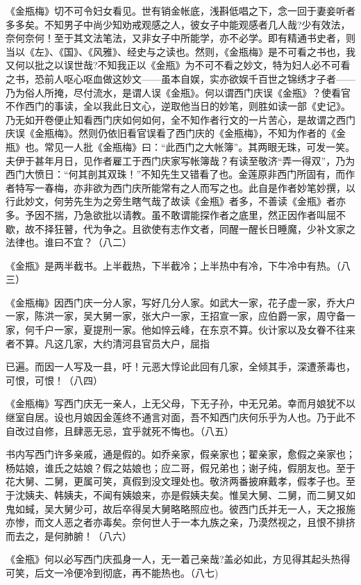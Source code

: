 {《金瓶梅》切不可令妇女看见。世有销金帐底，浅斟低唱之下，念一回于妻妾听者多多矣。不知男子中尚少知劝戒观感之人，彼女子中能观感者几人哉?少有效法，奈何奈何！至于其文法笔法，又非女子中所能学，亦不必学。即有精通书史者，则当以《左》、《国》、《风雅》、经史与之读也。然则，《金瓶梅》是不可看之书也，我又何以批之以误世哉?不知我正以《金瓶》为不可不看之妙文，特为妇人必不可看之书，恐前人呕心呕血做这妙文——虽本自娱，实亦欲娱千百世之锦绣才子者——乃为俗人所掩，尽付流水，是谓人误《金瓶》。何以谓西门庆误《金瓶》？使看官不作西门的事读，全以我此日文心，逆取他当日的妙笔，则胜如读一部《史记》。乃无如开卷便止知看西门庆如何如何，全不知作者行文的一片苦心，是故谓之西门庆误《金瓶梅》。然则仍依旧看官误看了西门庆的《金瓶梅》，不知为作者的《金瓶》也。常见一人批《金瓶梅》曰：“此西门之大帐簿”。其两眼无珠，可发一笑。夫伊于甚年月日，见作者雇工于西门庆家写帐簿哉？有读至敬济“弄一得双”，乃为西门大愤日：“何其剖其双珠！”不知先生又错看了也。金莲原非西门所固有，而作者特写一春梅，亦非欲为西门庆所能常有之人而写之也。此自是作者妙笔妙撰，以行此妙文，何劳先生为之旁生瞎气哉了故读《金瓶》者多，不善读《金瓶》者亦多。予因不揣，乃急欲批以请教。虽不敢谓能探作者之底里，然正因作者叫屈不歇，故不择狂瞽，代为争之。且欲使有志作文者，同醒一醒长日睡魔，少补文家之法律也。谁曰不宜？（八二）

《金瓶》是两半截书。上半截热，下半截冷；上半热中有冷，下牛冷中有热。（八三）

《金瓶梅》因西门庆一分人家，写好几分人家。如武大一家，花子虚一家，乔大户一家，陈洪一家，吴大舅一家，张大户一家，王招宣一家，应伯爵一家，周守备一家，何千户一家，夏提刑一家。他如悴云峰，在东京不算。伙计家以及女眷不往来者不算。凡这几家，大约清河县官员大户，屈指

已遍。而因一人写及一县，吁！元恶大惇论此回有几家，全倾其手，深遭荼毒也，可恨，可恨！（八四）

《金瓶梅》写西门庆无一亲人，上无父母，下无子孙，中无兄弟。幸而月娘犹不以继室自居。设也月娘因金莲终不通言对面，吾不知西门庆何乐乎为人也。乃于此不自改过自修，且肆恶无忌，宜乎就死不悔也。（八五）

书内写西门许多亲戚，通是假的。如乔亲家，假亲家也；翟亲家，愈假之亲家也；杨姑娘，谁氏之姑娘？假之姑娘也；应二哥，假兄弟也；谢子纯，假朋友也。至于花大舅、二舅，更属可笑，真假到没文理处也。敬济两番披麻戴孝，假孝子也。至于沈姨夫、韩姨夫，不闻有姨娘来，亦是假姨夫矣。惟吴大舅、二舅，而二舅又如鬼如蜮，吴大舅少可，故后卒得吴大舅略略照应也。彼西门氏并无一人，天之报施亦惨，而文人恶之者亦毒矣。奈何世人于一本九族之亲，乃漠然视之，且恨不排挤而去之，是何肺腑！（八六）

《金瓶》何以必写西门庆孤身一人，无一着己亲哉?盖必如此，方见得其起头热得可笑，后文一冷便冷到彻底，再不能热也。（八七)

}
